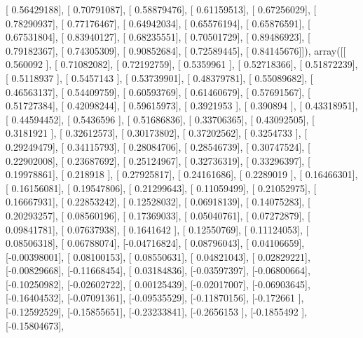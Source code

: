 \documentclass{article}
\begin{document}
       [ 0.56429188],
       [ 0.70791087],
       [ 0.58879476],
       [ 0.61159513],
       [ 0.67256029],
       [ 0.78290937],
       [ 0.77176467],
       [ 0.64942034],
       [ 0.65576194],
       [ 0.65876591],
       [ 0.67531804],
       [ 0.83940127],
       [ 0.68235551],
       [ 0.70501729],
       [ 0.89486923],
       [ 0.79182367],
       [ 0.74305309],
       [ 0.90852684],
       [ 0.72589445],
       [ 0.84145676]]), array([[ 0.560092  ],
       [ 0.71082082],
       [ 0.72192759],
       [ 0.5359961 ],
       [ 0.52718366],
       [ 0.51872239],
       [ 0.5118937 ],
       [ 0.5457143 ],
       [ 0.53739901],
       [ 0.48379781],
       [ 0.55089682],
       [ 0.46563137],
       [ 0.54409759],
       [ 0.60593769],
       [ 0.61460679],
       [ 0.57691567],
       [ 0.51727384],
       [ 0.42098244],
       [ 0.59615973],
       [ 0.3921953 ],
       [ 0.390894  ],
       [ 0.43318951],
       [ 0.44594452],
       [ 0.5436596 ],
       [ 0.51686836],
       [ 0.33706365],
       [ 0.43092505],
       [ 0.3181921 ],
       [ 0.32612573],
       [ 0.30173802],
       [ 0.37202562],
       [ 0.3254733 ],
       [ 0.29249479],
       [ 0.34115793],
       [ 0.28084706],
       [ 0.28546739],
       [ 0.30747524],
       [ 0.22902008],
       [ 0.23687692],
       [ 0.25124967],
       [ 0.32736319],
       [ 0.33296397],
       [ 0.19978861],
       [ 0.218918  ],
       [ 0.27925817],
       [ 0.24161686],
       [ 0.2289019 ],
       [ 0.16466301],
       [ 0.16156081],
       [ 0.19547806],
       [ 0.21299643],
       [ 0.11059499],
       [ 0.21052975],
       [ 0.16667931],
       [ 0.22853242],
       [ 0.12528032],
       [ 0.06918139],
       [ 0.14075283],
       [ 0.20293257],
       [ 0.08560196],
       [ 0.17369033],
       [ 0.05040761],
       [ 0.07272879],
       [ 0.09841781],
       [ 0.07637938],
       [ 0.1641642 ],
       [ 0.12550769],
       [ 0.11124053],
       [ 0.08506318],
       [ 0.06788074],
       [-0.04716824],
       [ 0.08796043],
       [ 0.04106659],
       [-0.00398001],
       [ 0.08100153],
       [ 0.08550631],
       [ 0.04821043],
       [ 0.02829221],
       [-0.00829668],
       [-0.11668454],
       [ 0.03184836],
       [-0.03597397],
       [-0.06800664],
       [-0.10250982],
       [-0.02602722],
       [ 0.00125439],
       [-0.02017007],
       [-0.06903645],
       [-0.16404532],
       [-0.07091361],
       [-0.09535529],
       [-0.11870156],
       [-0.172661  ],
       [-0.12592529],
       [-0.15855651],
       [-0.23233841],
       [-0.2656153 ],
       [-0.1855492 ],
       [-0.15804673],
\end{document}
